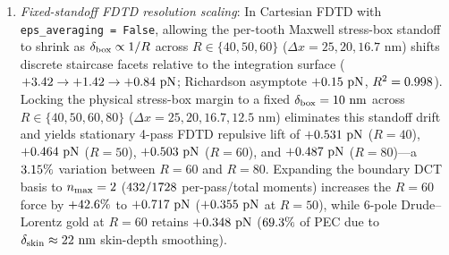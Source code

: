 \documentclass[pdflatex,sn-nature]{sn-jnl}
\DeclareRobustCommand{\roundtwo}[1]{\fpeval{round(#1,2)}}
\DeclareRobustCommand{\roundthree}[1]{\fpeval{round(#1,3)}}
\begin{document}
\begin{enumerate}
    \item \emph{Fixed-standoff FDTD resolution scaling}: In Cartesian FDTD with \texttt{eps\_averaging = False}, allowing the per-tooth Maxwell stress-box standoff to shrink as $\delta_{\rm box} \propto 1/R$ across $R \in \{40, 50, 60\}$ ($\Delta x = 25, 20, 16.7\text{ nm}$) shifts discrete staircase facets relative to the integration surface ($+\roundtwo{\CantorNtwoHybridrzMeepRfourzeroFZPn} \to +\roundtwo{\CantorNtwoHybridrzMeepRfivezeroFZPn} \to +\roundtwo{\CantorNtwoHybridrzMeepRsixzeroFZPn}\text{ pN}$; Richardson asymptote $+\roundtwo{\CantorNtwoHybridrzMeepRichardsonFZPn}\text{ pN}$, $R^2 = \roundthree{\NatureMeepRichardsonRtwoFourpass}$). Locking the physical stress-box margin to a fixed $\delta_{\rm box} = 10{}\text{ nm}$ across $R \in \{40, 50, 60, 80\}$ ($\Delta x = 25, 20, 16.7, 12.5\text{ nm}$) eliminates this standoff drift and yields stationary 4-pass FDTD repulsive lift of $+\roundthree{\MeepFixedboxRfourzeroFzPn}\text{ pN}$ ($R=40$), $+\roundthree{\MeepFixedboxRfivezeroFzPn}\text{ pN}$ ($R=50$), $+\roundthree{\MeepFixedboxRsixzeroFzPn}\text{ pN}$ ($R=60$), and $+\roundthree{\MeepFixedboxReightzeroFzPn}\text{ pN}$ ($R=80$)---a $\roundtwo{\MeepFixedboxRsixzeroToReightzeroDriftPct}\%$ variation between $R=60$ and $R=80$. Expanding the boundary DCT basis to $n_{\rm max}=2$ ($432{}/1728{}$ per-pass/total moments) increases the $R=60$ force by $+42.6{}\%$ to $+\roundthree{\MeepFixedboxRsixzeroNmaxtwoFzPn}\text{ pN}$ ($+\roundthree{\MeepFixedboxRfivezeroNmaxtwoFzPn}\text{ pN}$ at $R=50$), while 6-pole Drude--Lorentz gold at $R=60$ retains $+\roundthree{\MeepFixedboxRsixzeroGoldFzPn}\text{ pN}$ ($69.3{}\%$ of PEC due to $\delta_{\rm skin} \approx 22\text{ nm}$ skin-depth smoothing).
\end{enumerate}
\end{document}

